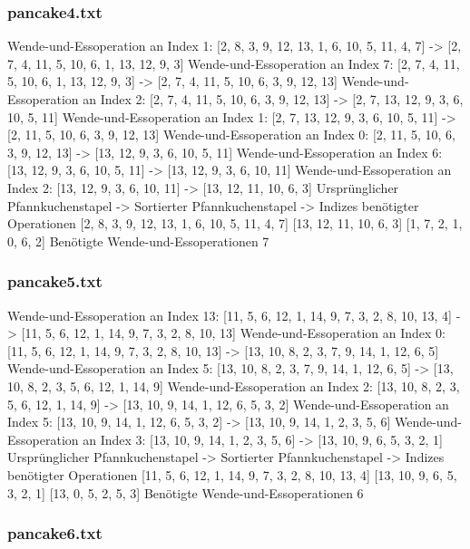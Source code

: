 {    \subsubsection{pancake4.txt}

    Wende-und-Essoperation an Index 1: [2, 8, 3, 9, 12, 13, 1, 6, 10, 5, 11, 4, 7] -> [2, 7, 4, 11, 5, 10, 6, 1, 13, 12, 9, 3]
    Wende-und-Essoperation an Index 7: [2, 7, 4, 11, 5, 10, 6, 1, 13, 12, 9, 3] -> [2, 7, 4, 11, 5, 10, 6, 3, 9, 12, 13]
    Wende-und-Essoperation an Index 2: [2, 7, 4, 11, 5, 10, 6, 3, 9, 12, 13] -> [2, 7, 13, 12, 9, 3, 6, 10, 5, 11]
    Wende-und-Essoperation an Index 1: [2, 7, 13, 12, 9, 3, 6, 10, 5, 11] -> [2, 11, 5, 10, 6, 3, 9, 12, 13]
    Wende-und-Essoperation an Index 0: [2, 11, 5, 10, 6, 3, 9, 12, 13] -> [13, 12, 9, 3, 6, 10, 5, 11]
    Wende-und-Essoperation an Index 6: [13, 12, 9, 3, 6, 10, 5, 11] -> [13, 12, 9, 3, 6, 10, 11]
    Wende-und-Essoperation an Index 2: [13, 12, 9, 3, 6, 10, 11] -> [13, 12, 11, 10, 6, 3]
    Ursprünglicher Pfannkuchenstapel -> Sortierter Pfannkuchenstapel -> Indizes benötigter Operationen
    [2, 8, 3, 9, 12, 13, 1, 6, 10, 5, 11, 4, 7]
    [13, 12, 11, 10, 6, 3]
    [1, 7, 2, 1, 0, 6, 2]
    Benötigte Wende-und-Essoperationen 7
    \subsubsection{pancake5.txt}

    Wende-und-Essoperation an Index 13: [11, 5, 6, 12, 1, 14, 9, 7, 3, 2, 8, 10, 13, 4] -> [11, 5, 6, 12, 1, 14, 9, 7, 3, 2, 8, 10, 13]
    Wende-und-Essoperation an Index 0: [11, 5, 6, 12, 1, 14, 9, 7, 3, 2, 8, 10, 13] -> [13, 10, 8, 2, 3, 7, 9, 14, 1, 12, 6, 5]
    Wende-und-Essoperation an Index 5: [13, 10, 8, 2, 3, 7, 9, 14, 1, 12, 6, 5] -> [13, 10, 8, 2, 3, 5, 6, 12, 1, 14, 9]
    Wende-und-Essoperation an Index 2: [13, 10, 8, 2, 3, 5, 6, 12, 1, 14, 9] -> [13, 10, 9, 14, 1, 12, 6, 5, 3, 2]
    Wende-und-Essoperation an Index 5: [13, 10, 9, 14, 1, 12, 6, 5, 3, 2] -> [13, 10, 9, 14, 1, 2, 3, 5, 6]
    Wende-und-Essoperation an Index 3: [13, 10, 9, 14, 1, 2, 3, 5, 6] -> [13, 10, 9, 6, 5, 3, 2, 1]
    Ursprünglicher Pfannkuchenstapel -> Sortierter Pfannkuchenstapel -> Indizes benötigter Operationen
    [11, 5, 6, 12, 1, 14, 9, 7, 3, 2, 8, 10, 13, 4]
    [13, 10, 9, 6, 5, 3, 2, 1]
    [13, 0, 5, 2, 5, 3]
    Benötigte Wende-und-Essoperationen 6
    \subsubsection{pancake6.txt}

}

